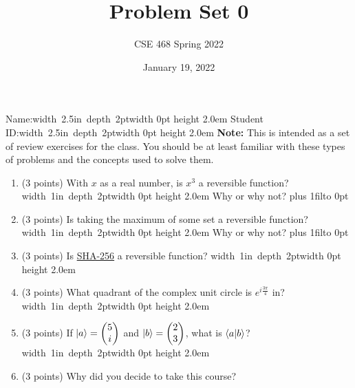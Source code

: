 \documentclass[12pt]{article}
\title{Problem Set 0}
\author{CSE 468 Spring 2022}
\date{January 19, 2022}
\newcommand{\Blank}{\mbox{\hskip 4pt\vrule width 1in depth 2pt}\vrule width 0pt height 2.0em}
\newcommand{\NameBlank}{\mbox{\hskip 4pt\vrule width 2.5in depth 2pt}\vrule width 0pt height 2.0em}
\def\DefaultSpace{1in}
\newcommand{\LeaveSpace}[1][\DefaultSpace]{%
\vskip #1 plus 1fil\relax\hbox to 0pt{\hss} %
}
\begin{document}
\maketitle

\noindent Name:\NameBlank{} \newline
\noindent Student ID:\NameBlank{} \newline
\newline
\noindent \textbf{Note:} This is intended as a set of review exercises for the class. You should be at least familiar with these types of problems and the concepts used to solve them.

\begin{enumerate}[font=\bfseries]
    \item (3 points) With $x$ as a real number, is $x^3$ a reversible function? \Blank{} Why or why not? \LeaveSpace[0.5in]
    \item (3 points) Is taking the maximum of some set a reversible function? \Blank{} Why or why not?\LeaveSpace{}
    \item (3 points) Is \href{https://en.wikipedia.org/wiki/SHA-2}{SHA-256} a reversible function? \Blank{} 
    \item (3 points) What quadrant of the complex unit circle is $e^{i\frac{3\pi}{4}}$ in?\Blank{}
    \item (3 points) If $\ket{a} = \begin{pmatrix}5 \\ i \end{pmatrix}$ and $\ket{b} = \begin{pmatrix}2 \\ 3 \end{pmatrix}$, what is $\braket{a|b}$?\Blank{}
    \item (3 points) Why did you decide to take this course? \newline
    
\end{enumerate}
\end{document}
